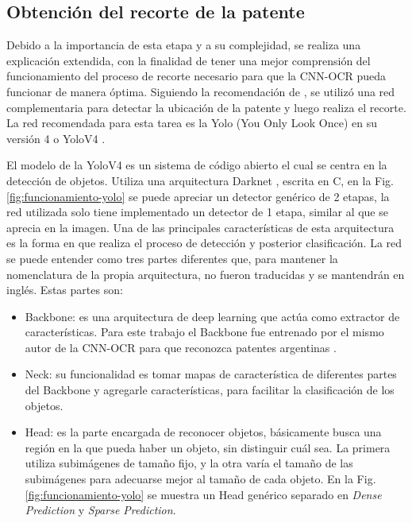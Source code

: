 \subsection{Obtención del recorte de la patente}

Debido a la importancia de esta etapa y a su complejidad, se realiza una explicación extendida, con la finalidad de tener una mejor comprensión del funcionamiento del proceso de recorte necesario para que la CNN-OCR pueda funcionar de manera óptima. Siguiendo la recomendación de \cite{ankandrew_reconocedor_2023}, se utilizó una red complementaria para detectar la ubicación de la patente y luego realiza el recorte. La red recomendada para esta tarea es la Yolo (You Only Look Once) en su versión 4 o YoloV4 \cite{bochkovskiy_yolov4_2020}.

El modelo de la YoloV4 es un sistema de código abierto el cual se centra en la detección de objetos. Utiliza una arquitectura Darknet \cite{noauthor_darknet_nodate}, escrita en C, en la Fig.\ref{fig:funcionamiento-yolo} se puede apreciar un detector genérico de 2 etapas, la red utilizada solo tiene implementado un detector de 1 etapa, similar al que se aprecia en la imagen.
Una de las principales características de esta arquitectura es la forma en que realiza el proceso de detección y posterior clasificación. La red se puede entender como tres partes diferentes que, para mantener la nomenclatura de la propia arquitectura, no fueron traducidas y se mantendrán en inglés. Estas partes son:

\begin{itemize}
    \item Backbone: es una arquitectura de deep learning que actúa como extractor de características.
          Para este trabajo el Backbone fue entrenado por el mismo autor de la CNN-OCR para que reconozca patentes argentinas \cite{ankandrew_localizador_2021}.
    \item Neck: su funcionalidad es tomar mapas de característica de diferentes partes del Backbone y agregarle características, para facilitar la clasificación de los objetos.

    \item Head: es la parte encargada de reconocer objetos, básicamente busca una región en la que pueda haber un objeto, sin distinguir cuál sea. La primera utiliza subimágenes de tamaño fijo, y la otra varía el tamaño de las subimágenes para adecuarse mejor al tamaño de cada objeto.
          En la Fig. \ref{fig:funcionamiento-yolo} se muestra un Head genérico separado en \textit{Dense Prediction} y \textit{Sparse Prediction}.
\end{itemize}

